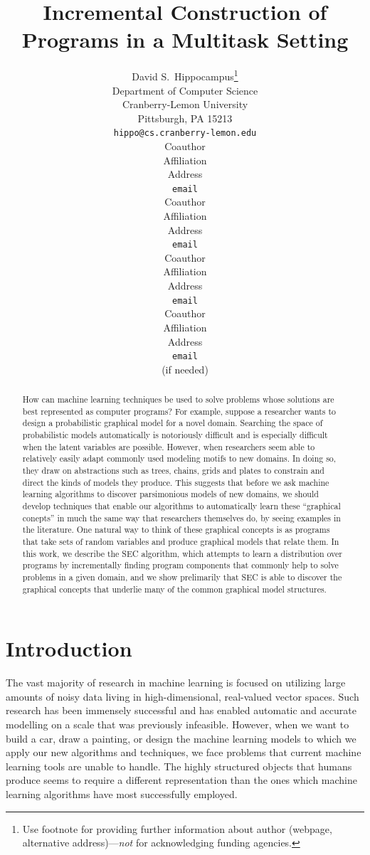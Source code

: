 \documentclass{article} %
\title{Incremental Construction of Programs in a Multitask Setting}
\author{
David S.~Hippocampus\thanks{ Use footnote for providing further information
about author (webpage, alternative address)---\emph{not} for acknowledging
funding agencies.} \\
Department of Computer Science\\
Cranberry-Lemon University\\
Pittsburgh, PA 15213 \\
\texttt{hippo@cs.cranberry-lemon.edu} \\
\And
Coauthor \\
Affiliation \\
Address \\
\texttt{email} \\
\AND
Coauthor \\
Affiliation \\
Address \\
\texttt{email} \\
\And
Coauthor \\
Affiliation \\
Address \\
\texttt{email} \\
\And
Coauthor \\
Affiliation \\
Address \\
\texttt{email} \\
(if needed)\\
}
\begin{document}
\maketitle

\begin{abstract}
How can machine learning techniques be used to solve problems whose solutions are best represented as computer programs? For example, suppose a researcher wants to design a probabilistic graphical model for a novel domain. Searching the space of probabilistic models automatically is notoriously difficult and is especially difficult when the latent variables are possible. However, when researchers seem able to relatively easily adapt commonly used modeling motifs to new domains. In doing so, they draw on abstractions such as trees, chains, grids and plates to constrain and direct the kinds of models they produce. This suggests that before we ask machine learning algorithms to discover parsimonious models of new domains, we should develop techniques that enable our algorithms to automatically learn these ``graphical conepts'' in much the same way that researchers themselves do, by seeing examples in the literature. One natural way to think of these graphical concepts is as programs that take sets of random variables and produce graphical models that relate them. In this work, we describe the SEC algorithm, which attempts to learn a distribution over programs by incrementally finding program components that commonly help to solve problems in a given domain, and we show prelimarily that SEC is able to discover the graphical concepts that underlie many of the common graphical model structures.  
\end{abstract}


\section{Introduction}


The vast majority of research in machine learning is focused on utilizing large amounts of noisy data living in high-dimensional, real-valued vector spaces. Such research has been immensely successful and has enabled automatic and accurate modelling on a scale that was previously infeasible. However, when we want to build a car, draw a painting, or design the machine learning models to which we apply our new algorithms and techniques, we face problems that current machine learning tools are unable to handle. The highly structured objects that humans produce seems to require a different representation than the ones which machine learning algorithms have most successfully employed. 
\end{document}
